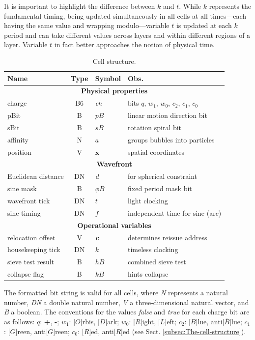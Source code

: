 \documentclass[12pt]{article}
\begin{document}
It is important to highlight the difference between $k$ and $t$. While $k$ represents the fundamental timing, being updated simultaneously in all cells at all times—each having the same value and wrapping modulo—variable $t$ is updated at each $k$ period and can take different values across layers and within different regions of a layer. Variable $t$ in fact better approaches the notion of physical time.

\begin{table}
\begin{centering}
\begin{tabular}{|l|c|l|l|}
\hline 
\textbf{\large{}Name} & \textbf{\large{}Type} & \textbf{\large{}Symbol} & \textbf{\large{}Obs.}\tabularnewline
\hline 
\hline 
\multicolumn{4}{|c|}{\textbf{Physical properties}}\tabularnewline
\hline 
charge & B6 & \emph{ch} & bits $q$, $w_{1}$, $w_{0}$, $c_{2}$, $c_{1}$, $c_{0}$\tabularnewline
\hline 
pBit & B & $pB$ & linear motion direction bit\tabularnewline
\hline 
sBit & B & $sB$ & rotation spiral bit\tabularnewline
\hline 
affinity & N & $a$ & groups bubbles into particles\tabularnewline
\hline 
position & V & $\boldsymbol{x}$ & spatial coordinates\tabularnewline
\hline 
\multicolumn{4}{|c|}{\textbf{Wavefront}}\tabularnewline
\hline 
Euclidean distance & DN & \emph{d} & for spherical constraint\tabularnewline
\hline 
sine mask & B & $\phi B$ & fixed period mask bit\tabularnewline
\hline 
wavefront tick & DN & $t$ & light clocking\tabularnewline
\hline 
sine timing & DN & $f$ & independent time for sine (arc)\tabularnewline
\hline 
\multicolumn{4}{|c|}{\textbf{Operational variables}}\tabularnewline
\hline 
relocation offset & V & \textbf{\emph{c}} & determines reissue address\tabularnewline
\hline 
housekeeping tick & DN & $k$ & timeless clocking\tabularnewline
\hline 
sieve test result & B & $hB$ & combined sieve test\tabularnewline
\hline 
collapse flag & B & $kB$ & hints collapse\tabularnewline
\hline 
\end{tabular}
\par\end{centering}

\caption{Cell structure.}

{\small{}The formatted bit string is valid for all cells, where }\emph{\small{}N}{\small{}
represents a natural number, }\emph{\small{}DN}{\small{} 
a double natural number, }\emph{\small{}V}{\small{} a three-dimensional natural vector, and }\emph{\small{}B}{\small{} 
a boolean. The conventions for the values }\emph{\small{}false}{\small{} and }\emph{\small{}true}{\small{} for each 
charge bit are as follows: $q$: }\textbf{\small{}+}{\small{}, }\textbf{\small{}-}{\small{}; $w_{1}$: {[}$O${]}rbis, {[}$D${]}ark; 
$w_{0}$: {[}$R${]}ight, {[}$L${]}eft; $c_{2}$: {[}$B${]}lue, anti{[}$\bar{B}${]}lue; $c_{1}$: {[}$G${]}reen, anti{[}$\bar{G}${]}reen; 
$c_{0}$: {[}$R${]}ed, anti{[}$\bar{R}${]}ed (see Sect. \ref{subsec:The-cell-structure}).}\label{tab:Cell-structure}
\end{table}
\end{document}
